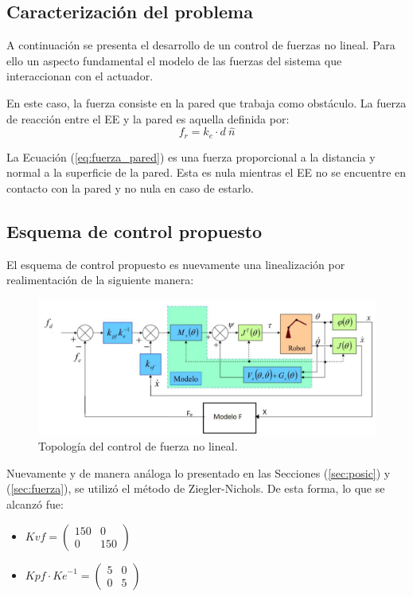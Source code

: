 %

%

\subsection{Caracterización del problema}
A continuación se presenta el desarrollo de un control de fuerzas no lineal. Para ello un aspecto fundamental el modelo de las fuerzas del sistema que interaccionan con el actuador.

En este caso, la fuerza consiste en la pared que trabaja como obstáculo. La fuerza de reacción entre el EE y la pared es aquella definida por:
\begin{equation}
f_r = k_e \cdot d \ \hat{n}
\label{eq:fuerza_pared}
\end{equation}

La Ecuación (\ref{eq:fuerza_pared}) es una fuerza proporcional a la distancia y normal a la superficie de la pared. Esta es nula mientras el EE no se encuentre en contacto con la pared y no nula en caso de estarlo.

\subsection{Esquema de control propuesto}
El esquema de control propuesto es nuevamente una linealización por realimentación de la siguiente manera:

\begin{figure}[H]
	\centering
	\includegraphics[width=0.8\linewidth]{ImagenesControl de fuerza no lineal/controlf}
	\caption{Topología del control de fuerza no lineal.}	
	\label{fig:control_f_modelo}
\end{figure}


\label{sec:fuerza_}
Nuevamente y de manera análoga lo presentado en las Secciones (\ref{sec:posic}) y (\ref{sec:fuerza}), se utilizó el método de Ziegler-Nichols. De esta forma, lo que se alcanzó fue:
\begin{multicols}{2}
\begin{itemize}
	\item $Kvf = \begin{pmatrix}
	150 & 0 \\
	0 & 150
	\end{pmatrix}$
	\item $Kpf \cdot {Ke}^{-1} =
	\begin{pmatrix}
	5 & 0 \\
	0 & 5
	\end{pmatrix}$
\end{itemize}
\end{multicols}

